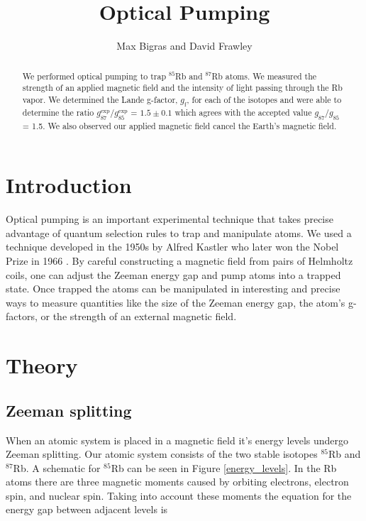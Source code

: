 
\title{Optical Pumping}
\author{Max Bigras and David Frawley}



\maketitle

\begin{abstract}
We performed optical pumping to trap $^{85}$Rb and  $^{87}$Rb atoms. We measured the strength of an applied magnetic field and the intensity of light passing through the Rb vapor. We determined the Lande g-factor, $g_{\mathrm{f}}$, for each of the isotopes and were able to determine the ratio $g^{\mathrm{exp}}_{87}$/$g^{\mathrm{exp}}_{85}$ = $1.5 \pm 0.1$ which agrees with the accepted value $g_{87}$/$g_{85}$ = 1.5. We also observed our applied magnetic field cancel the Earth's magnetic field.
\end{abstract}

\section{Introduction}
Optical pumping is an important experimental technique that takes precise advantage of quantum selection rules to trap and manipulate atoms. We used a technique developed in the 1950s by Alfred Kastler who later won the Nobel Prize in 1966 \cite{wiki}. By careful constructing a magnetic field from pairs of Helmholtz coils, one can adjust the Zeeman energy gap and pump atoms into a trapped state. Once trapped the atoms can be manipulated in interesting and precise ways to measure quantities like the size of the Zeeman energy gap, the atom's g-factors, or the strength of an external magnetic field.


\section{Theory}
\subsection{Zeeman splitting}
When an atomic system is placed in a magnetic field it's energy levels undergo Zeeman splitting. Our atomic system consists of the two stable isotopes $^{85}$Rb and  $^{87}$Rb. A schematic for $^{85}$Rb can be seen in Figure \ref{energy_levels}. In the Rb atoms there are three magnetic moments caused by orbiting electrons, electron spin, and nuclear spin. Taking into account these moments the equation for the energy gap between adjacent levels is

